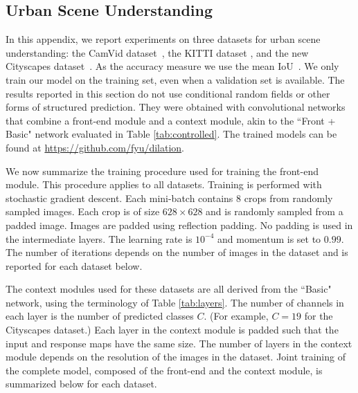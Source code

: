 \begin{appendices}

\section{Urban Scene Understanding}

In this appendix, we report experiments on three datasets for urban scene understanding: the CamVid dataset~\citep{Brostow:2009:PRL}, the KITTI dataset \citep{GeigerLSU13}, and the new Cityscapes dataset~\citep{Cordts:2016:CVPR}. As the accuracy measure we use the mean IoU~\citep{Everingham2010}. We only train our model on the training set, even when a validation set is available. The results reported in this section do not use conditional random fields or other forms of structured prediction. They were obtained with convolutional networks that combine a front-end module and a context module, akin to the ``Front + Basic" network evaluated in Table \ref{tab:controlled}. The trained models can be found at \url{https://github.com/fyu/dilation}.

We now summarize the training procedure used for training the front-end module. This procedure applies to all datasets. Training is performed with stochastic gradient descent. Each mini-batch contains 8 crops from randomly sampled images. Each crop is of size $628\!\times\!628$ and is randomly sampled from a padded image. Images are padded using reflection padding. No padding is used in the intermediate layers. The learning rate is $10^{-4}$ and momentum is set to $0.99$. The number of iterations depends on the number of images in the dataset and is reported for each dataset below.

The context modules used for these datasets are all derived from the ``Basic" network, using the terminology of Table \ref{tab:layers}. The number of channels in each layer is the number of predicted classes $C$. (For example, $C\!=\!19$ for the Cityscapes dataset.) Each layer in the context module is padded such that the input and response maps have the same size. The number of layers in the context module depends on the resolution of the images in the dataset.
Joint training of the complete model, composed of the front-end and the context module, is summarized below for each dataset.


\end{appendices}
